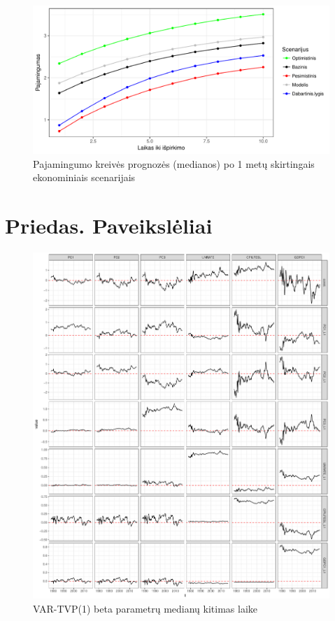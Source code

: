 \documentclass[12pt,lithuanian,]{article}
\begin{document}
\begin{figure}[htbp]
\centering
\includegraphics{bayesFAVAR_TVP_files/figure-latex/unnamed-chunk-11-1.pdf}
\caption{\label{fig:yc_forecast} Pajamingumo kreivės prognozės
(medianos) po 1 metų skirtingais ekonominiais scenarijais}
\end{figure}

\newpage

\section{Priedas. Paveikslėliai}\label{priedas.-paveiksleliai}

\begin{figure}[!htbp]

{\centering \includegraphics{bayesFAVAR_TVP_files/figure-latex/beta-1} 

}

\caption{\label{fig:beta_t}VAR-TVP(1) beta parametrų medianų kitimas laike}\label{fig:beta}
\end{figure}
\end{document}
